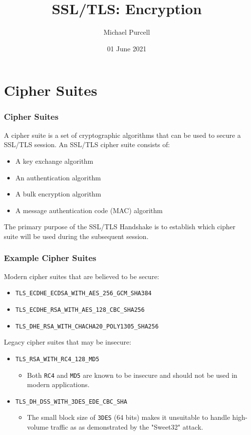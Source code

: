 \documentclass[aspectratio=169]{beamer}
\title{SSL/TLS: Encryption}
\author{Michael Purcell}
\date{01 June 2021}
\begin{document}
\begin{frame}[Roundel=siiorange]
\titlepage
\end{frame}

\section{Cipher Suites}
\begin{frame}[Roundel=siiorange]
	\tocpage
\end{frame}

\begin{frame}
	\frametitle{Cipher Suites}
	A cipher suite is a set of cryptographic algorithms that can be used to secure a SSL/TLS session. An SSL/TLS cipher suite consists of:
	\begin{itemize}
		\item A key exchange algorithm
		\item An authentication algorithm
		\item A bulk encryption algorithm
		\item A message authentication code (MAC) algorithm
	\end{itemize}
	
	\vfill
	
	The primary purpose of the SSL/TLS Handshake is to establish which cipher suite will be used during the subsequent session.
\end{frame}

\begin{frame}
	\frametitle{Example Cipher Suites}
	Modern cipher suites that are believed to be secure:
	\begin{itemize}
		\item \texttt{TLS\_ECDHE\_ECDSA\_WITH\_AES\_256\_GCM\_SHA384}
		\item \texttt{TLS\_ECDHE\_RSA\_WITH\_AES\_128\_CBC\_SHA256}
		\item \texttt{TLS\_DHE\_RSA\_WITH\_CHACHA20\_POLY1305\_SHA256}
	\end{itemize}
	
	\vfill
	
	Legacy cipher suites that may be insecure:
	\begin{itemize}		
		\item \texttt{TLS\_RSA\_WITH\_RC4\_128\_MD5}
		\begin{itemize}
			\item Both \texttt{RC4} and \texttt{MD5} are known to be insecure and should not be used in modern applications.
		\end{itemize}
		\item \texttt{TLS\_DH\_DSS\_WITH\_3DES\_EDE\_CBC\_SHA}
		\begin{itemize}
			\item The small block size of \texttt{3DES} (64 bits) makes it unsuitable to handle high-volume traffic as as demonstrated by the "Sweet32" attack.
		\end{itemize}
	\end{itemize}
\end{frame}
\end{document}
